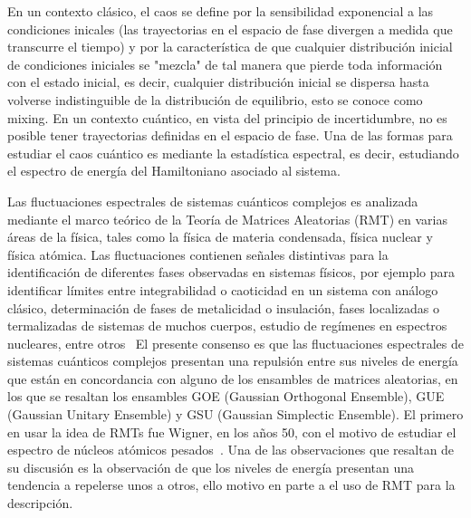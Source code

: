 \documentclass[spanish,titlepage,table]{practicas}
\begin{document}
En un contexto clásico, el caos se define por la sensibilidad exponencial a las condiciones inicales 
(las trayectorias en el espacio de fase divergen a medida que transcurre el tiempo) y por la característica de que cualquier distribución inicial de condiciones 
iniciales se "mezcla" de tal manera que pierde toda información con el estado inicial, es decir, cualquier distribución inicial se dispersa hasta volverse indistinguible de la distribución de equilibrio, esto se conoce como mixing. En un contexto cuántico, en vista del principio de incertidumbre, no es posible tener 
trayectorias definidas en el espacio de fase. Una de las formas para estudiar el caos cuántico es mediante la estadística espectral, es decir, estudiando el espectro de energía del Hamiltoniano asociado al sistema.

Las fluctuaciones espectrales de sistemas cuánticos complejos es analizada mediante 
el marco teórico de la Teoría de Matrices Aleatorias (RMT) en varias áreas de la física, 
tales como la física de materia condensada, física nuclear y física atómica.
Las fluctuaciones contienen señales distintivas para la identificación de diferentes fases observadas 
en sistemas físicos, por ejemplo para identificar límites entre integrabilidad o caoticidad en un sistema con análogo clásico,
determinación de fases de metalicidad o insulación, fases localizadas o termalizadas de sistemas de muchos cuerpos, estudio de regímenes en espectros nucleares, entre otros~\cite{Tekur2020}
El presente consenso es que las fluctuaciones espectrales de sistemas cuánticos complejos presentan 
una repulsión entre sus niveles de energía que están en concordancia con alguno de los ensambles de matrices 
aleatorias, en los que se resaltan los ensambles GOE (Gaussian Orthogonal Ensemble), GUE (Gaussian Unitary Ensemble) y GSU (Gaussian Simplectic Ensemble).
El primero en usar la idea de RMTs fue Wigner, en los años 50, con el motivo de estudiar el espectro de núcleos atómicos pesados~\cite{Wigner1955}.
Una de las observaciones que resaltan de su discusión es la observación de que los niveles de energía presentan una tendencia a repelerse unos a otros, 
ello motivo en parte a el uso de RMT para la descripción.
\end{document}
